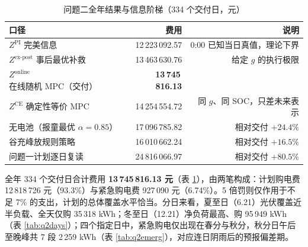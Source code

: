 \documentclass[12pt,a4paper]{ctexart}
\newcommand{\Zon}{Z^{\mathrm{online}}}
\newcommand{\ZCE}{Z^{\mathrm{CE}}}
\newcommand{\Zep}{Z^{\mathrm{ex\text{-}post}}}
\newcommand{\ZPI}{Z^{\mathrm{PI}}}
\begin{document}
\begin{table}[H]
\centering\footnotesize
\caption{问题二全年结果与信息阶梯（334 个交付日，元）}
\begin{tabular}{lrr}
\toprule
口径 & 费用 & 说明 \\
\midrule
$\ZPI$ 完美信息 & 12\,223\,092.57 & 0:00 已知当日真值，理论下界 \\
$\Zep$ 事后最优补救 & 13\,463\,630.76 & 给定 $g$ 的执行极限 \\
$\Zon$ 在线随机 MPC（交付） & \textbf{13\,745\,816.13} & \\
$\ZCE$ 确定性等价 MPC & 14\,254\,554.72 & 同 $g$、同 SOC，只差未来表示 \\
\midrule
无电池（报童最优 $\alpha{=}0.85$） & 17\,096\,785.82 & 相对交付 $+24.4\%$ \\
谷充峰放规则策略 & 16\,010\,662.24 & 相对交付 $+16.5\%$ \\
问题一计划逐日复读 & 24\,816\,066.97 & 相对交付 $+80.5\%$ \\
\bottomrule
\end{tabular}
\label{tab:q2ladder}
\end{table}

全年 334 个交付日合计费用 \textbf{13\,745\,816.13 元}（表 \ref{tab:q2ladder}），由两笔构成：计划购电费 12\,818\,726 元（93.3\%）与紧急购电费 927\,090 元（6.74\%）。5 倍罚则仅作用于不足 7\% 的支出，计划的总体覆盖水平恰当。分日来看，夏至日（6.21）光伏覆盖近半负载、全天仅购 35\,318 kWh；冬至日（12.21）净负荷最高、购 95\,949 kWh（表 \ref{tab:q2days}）；四个指定日中，紧急购电仅出现在春分与秋分，秋分日午后至晚峰共 7 段 2\,259 kWh（表 \ref{tab:q2emerg}），对应连日阴雨后的预报偏差期。

\begin{table}[H]
\centering\footnotesize
\caption{问题二表 1：四个指定日的计划购电量（kWh）与购电费（元，含紧急费）}
\label{tab:q2days}
\end{table}
\end{document}

